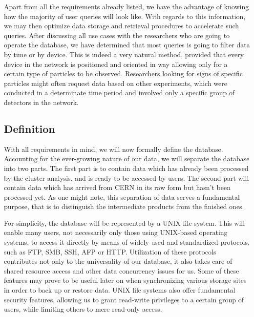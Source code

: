 Apart from all the requirements already listed, we have the advantage of knowing how the majority of user queries will look like. With regards to this information, we may then optimize data storage and retrieval procedures to accelerate such queries. After discussing all use cases with the researchers who are going to operate the database, we have determined that most queries is going to filter data by time or by device. This is indeed a very natural method, provided that every device in the network is positioned and oriented in way allowing only for a certain type of particles to be observed. Researchers looking for signs of specific particles might often request data based on other experiments, which were conducted in a determinate time period and involved only a specific group of detectors in the network.


\subsection{Definition}
\label{db:definition}
With all requirements in mind, we will now formally define the database. Accounting for the ever-growing nature of our data, we will separate the database into two parts. The first part is to contain data which has already been processed by the cluster analysis, and is ready to be accessed by users. The second part will contain data which has arrived from CERN in its raw form but hasn't been processed yet. As one might note, this separation of data serves a fundamental purpose, that is to distinguish the intermediate products from the finished ones.


For simplicity, the database will be represented by a UNIX file system. This will enable many users, not necessarily only those using UNIX-based operating systems, to access it directly by means of widely-used and standardized protocols, such as FTP, SMB, SSH, AFP or HTTP\label{db:supported-protocols}. Utilization of these protocols contributes not only to the universality of our database, it also takes care of shared resource access and other data concurrency issues for us. Some of these features may prove to be useful later on when synchronizing various storage sites in order to back up or restore data. UNIX file systems also offer fundamental security features, allowing us to grant read-write privileges to a certain group of users, while limiting others to mere read-only access.

